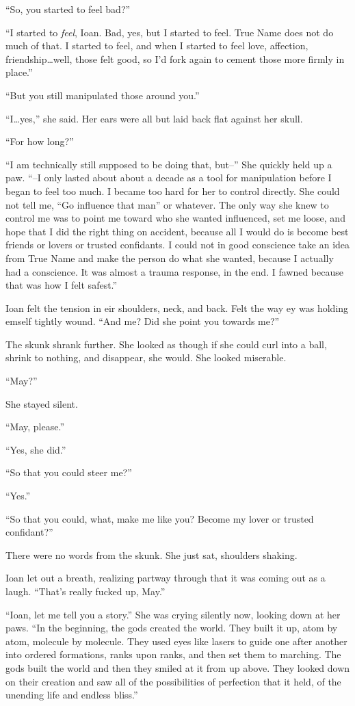 ``So, you started to feel bad?''

``I started to \emph{feel}, Ioan. Bad, yes, but I started to feel. True Name does not do much of that. I started to feel, and when I started to feel love, affection, friendship\ldots well, those felt good, so I'd fork again to cement those more firmly in place.''

``But you still manipulated those around you.''

``I\ldots yes,'' she said. Her ears were all but laid back flat against her skull.

``For how long?''

``I am technically still supposed to be doing that, but--'' She quickly held up a paw. ``--I only lasted about about a decade as a tool for manipulation before I began to feel too much. I became too hard for her to control directly. She could not tell me, ``Go influence that man'' or whatever. The only way she knew to control me was to point me toward who she wanted influenced, set me loose, and hope that I did the right thing on accident, because all I would do is become best friends or lovers or trusted confidants. I could not in good conscience take an idea from True Name and make the person do what she wanted, because I actually had a conscience. It was almost a trauma response, in the end. I fawned because that was how I felt safest.''

Ioan felt the tension in eir shoulders, neck, and back. Felt the way ey was holding emself tightly wound. ``And me? Did she point you towards me?''

The skunk shrank further. She looked as though if she could curl into a ball, shrink to nothing, and disappear, she would. She looked miserable.

``May?''

She stayed silent.

``May, please.''

``Yes, she did.''

``So that you could steer me?''

``Yes.''

``So that you could, what, make me like you? Become my lover or trusted confidant?''

There were no words from the skunk. She just sat, shoulders shaking.

Ioan let out a breath, realizing partway through that it was coming out as a laugh. ``That's really fucked up, May.''

``Ioan, let me tell you a story.'' She was crying silently now, looking down at her paws. ``In the beginning, the gods created the world. They built it up, atom by atom, molecule by molecule. They used eyes like lasers to guide one after another into ordered formations, ranks upon ranks, and then set them to marching. The gods built the world and then they smiled at it from up above. They looked down on their creation and saw all of the possibilities of perfection that it held, of the unending life and endless bliss.''

